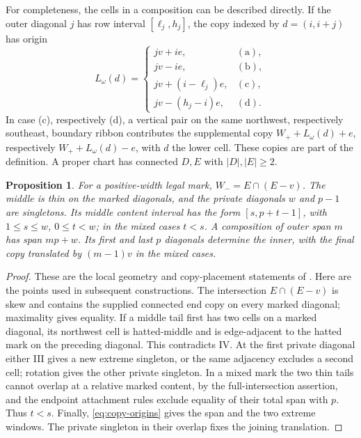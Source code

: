 \documentclass[11pt,a4paper]{amsart}
\numberwithin{equation}{section}
\theoremstyle{plain}
\newtheorem{proposition}[theorem]{Proposition}
\theoremstyle{definition}
\begin{document}
For completeness, the cells in a composition can be described directly.  If the outer diagonal \(j\) has row interval \([\ell_j,h_j]\), the copy indexed by \(d=(i,i+j)\) has origin
\begin{equation}\label{eq:copy-origins}
 L_\omega(d)=
 \begin{cases}
 jv+ie,&\mathrm{(a)},\\
 jv-ie,&\mathrm{(b)},\\
 jv+(i-\ell_j)e,&\mathrm{(c)},\\
 jv-(h_j-i)e,&\mathrm{(d)}.
 \end{cases}
\end{equation}
In case (c), respectively (d), a vertical pair on the same northwest, respectively southeast, boundary ribbon contributes the supplemental copy
\(W_++L_\omega(d)+e\), respectively \(W_++L_\omega(d)-e\), with \(d\) the lower cell.  These copies are part of the definition.  A proper chart has connected \(D,E\) with \(|D|,|E|\ge2\).

\begin{proposition}\label{prop:local-data}
For a positive-width legal mark, \(W_-=E\cap(E-v)\).  The middle is thin on the marked diagonals, and the private diagonals \(w\) and \(p-1\) are singletons.  Its middle content interval has the form \([s,p+t-1]\), with \(1\le s\le w\), \(0\le t<w\); in the mixed cases \(t<s\).  A composition of outer span \(m\) has span \(mp+w\).  Its first and last \(p\) diagonals determine the inner, with the final copy translated by \((m-1)v\) in the mixed cases.
\end{proposition}
\begin{proof}
These are the local geometry and copy-placement statements of \cite[Lemma \textup{(local geometry)}]{Shields2026Gluing}.  Here are the points used in subsequent constructions.  The intersection \(E\cap(E-v)\) is skew and contains the supplied connected end copy on every marked diagonal; maximality gives equality.  If a middle tail first has two cells on a marked diagonal, its northwest cell is hatted-middle and is edge-adjacent to the hatted mark on the preceding diagonal.  This contradicts IV.  At the first private diagonal either III gives a new extreme singleton, or the same adjacency excludes a second cell; rotation gives the other private singleton.  In a mixed mark the two thin tails cannot overlap at a relative marked content, by the full-intersection assertion, and the endpoint attachment rules exclude equality of their total span with \(p\).  Thus \(t<s\).  Finally, \eqref{eq:copy-origins} gives the span and the two extreme windows.  The private singleton in their overlap fixes the joining translation.
\end{proof}
\end{document}
